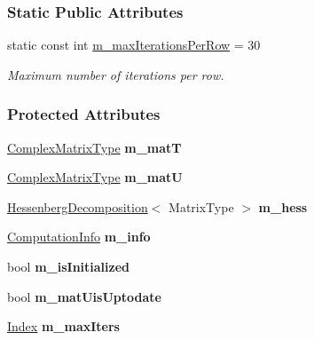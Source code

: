 \subsubsection*{Static Public Attributes}
\begin{DoxyCompactItemize}
\item 
static const int \hyperlink{group___eigenvalues___module_a891e98fa0c95cb14896e8a2ffd7e4fe8}{m\+\_\+max\+Iterations\+Per\+Row} = 30
\begin{DoxyCompactList}\small\item\em Maximum number of iterations per row. \end{DoxyCompactList}\end{DoxyCompactItemize}
\subsubsection*{Protected Attributes}
\begin{DoxyCompactItemize}
\item 
\mbox{\label{group___eigenvalues___module_a1ae856aee520ee8fca06376fc7fd8b6a}} 
\hyperlink{group___eigenvalues___module_af61fe57877d51cfb50178f78534042f0}{Complex\+Matrix\+Type} {\bfseries m\+\_\+matT}
\item 
\mbox{\label{group___eigenvalues___module_a53fefee5d25b8853fbd0b2c4f0873a9a}} 
\hyperlink{group___eigenvalues___module_af61fe57877d51cfb50178f78534042f0}{Complex\+Matrix\+Type} {\bfseries m\+\_\+matU}
\item 
\mbox{\label{group___eigenvalues___module_a826633db255957051d1a904498145746}} 
\hyperlink{group___eigenvalues___module_class_eigen_1_1_hessenberg_decomposition}{Hessenberg\+Decomposition}$<$ Matrix\+Type $>$ {\bfseries m\+\_\+hess}
\item 
\mbox{\label{group___eigenvalues___module_adb18a90a2087d7a89253275d311418c6}} 
\hyperlink{group__enums_ga85fad7b87587764e5cf6b513a9e0ee5e}{Computation\+Info} {\bfseries m\+\_\+info}
\item 
\mbox{\label{group___eigenvalues___module_a48e29539f604b170a3e757f5cbeeb818}} 
bool {\bfseries m\+\_\+is\+Initialized}
\item 
\mbox{\label{group___eigenvalues___module_a8a6b06445c8c2a10191052880cadb7cd}} 
bool {\bfseries m\+\_\+mat\+Uis\+Uptodate}
\item 
\mbox{\label{group___eigenvalues___module_a2e55a5d20381f8f898872f318d591785}} 
\hyperlink{group___eigenvalues___module_a652104d13723a5b1db2937866a034557}{Index} {\bfseries m\+\_\+max\+Iters}
\end{DoxyCompactItemize}
